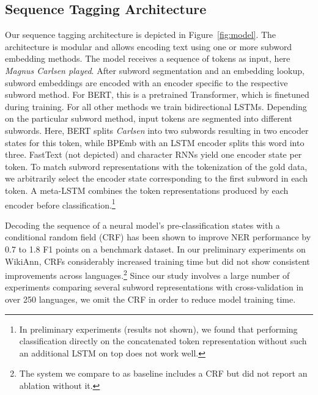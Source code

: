 \documentclass[11pt,a4paper]{article}
\begin{document}
\subsection{Sequence Tagging Architecture}
\label{sec:model}
Our sequence tagging architecture is depicted in Figure~\ref{fig:model}.
The architecture is modular and allows encoding text using one or more subword embedding methods.
The model receives a sequence of tokens as input, here \emph{Magnus Carlsen played}.
After subword segmentation and an embedding lookup, subword embeddings are encoded with an encoder specific to the respective subword method.
For BERT, this is a pretrained Transformer, which is finetuned during training.
For all other methods we train bidirectional LSTMs.
Depending on the particular subword method, input tokens are segmented into different subwords.
Here, BERT splits \emph{Carlsen} into two subwords resulting in two encoder states for this token, while BPEmb with an LSTM encoder splits this word into three.
FastText (not depicted) and character RNNs yield one encoder state per token.
To match subword representations with the tokenization of the gold data, we arbitrarily select the encoder state corresponding to the first subword in each token.
A meta-LSTM combines the token representations produced by each encoder before classification.\footnote{In preliminary experiments (results not shown), we found that performing classification directly on the concatenated token representation without such an additional LSTM on top does not work well.}

Decoding the sequence of a neural model's pre-classification states with a conditional random field (CRF) \citep{lafferty01} has been shown to improve NER performance by 0.7 to 1.8 F1 points \citep{ma2016endtoend,reimers2017distributions} on a benchmark dataset.
In our preliminary experiments on WikiAnn, CRFs considerably increased training time but did not show consistent improvements across languages.\footnote{The system we compare to as baseline \citep{pan2017crosslingual} includes a CRF but did not report an ablation without it.}
Since our study involves a large number of experiments comparing several subword representations with cross-validation in over 250 languages, we omit the CRF in order to reduce model training time.
\end{document}
